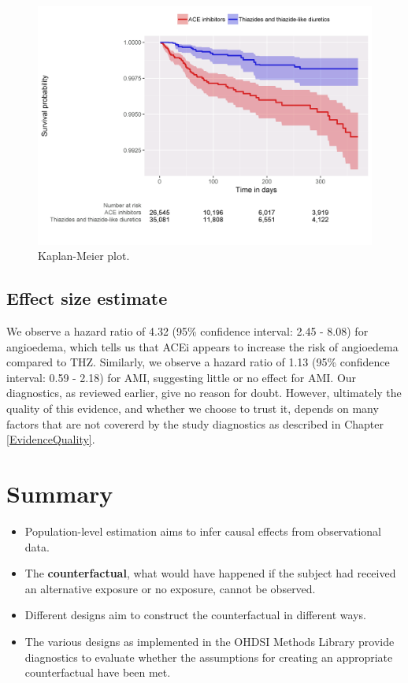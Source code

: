 \documentclass[11pt]{book}
\theoremstyle{definition}
\theoremstyle{definition}
\theoremstyle{definition}
\theoremstyle{remark}
\let\BeginKnitrBlock\begin \let\EndKnitrBlock\end
\begin{document}
\begin{figure}

{\centering \includegraphics[width=1\linewidth]{images/PopulationLevelEstimation/kmPlot} 

}

\caption{Kaplan-Meier plot.}\label{fig:kmPlot}
\end{figure}

\hypertarget{effect-size-estimate}{%
\subsection{Effect size estimate}\label{effect-size-estimate}}

We observe a hazard ratio of 4.32 (95\% confidence interval: 2.45 - 8.08) for angioedema, which tells us that ACEi appears to increase the risk of angioedema compared to THZ. Similarly, we observe a hazard ratio of 1.13 (95\% confidence interval: 0.59 - 2.18) for AMI, suggesting little or no effect for AMI. Our diagnostics, as reviewed earlier, give no reason for doubt. However, ultimately the quality of this evidence, and whether we choose to trust it, depends on many factors that are not covererd by the study diagnostics as described in Chapter \ref{EvidenceQuality}.

\hypertarget{summary-9}{%
\section{Summary}\label{summary-9}}

\BeginKnitrBlock{rmdsummary}
\begin{itemize}
\item
  Population-level estimation aims to infer causal effects from observational data.
\item
  The \textbf{counterfactual}, what would have happened if the subject had received an alternative exposure or no exposure, cannot be observed.
\item
  Different designs aim to construct the counterfactual in different ways.
\item
  The various designs as implemented in the OHDSI Methods Library provide diagnostics to evaluate whether the assumptions for creating an appropriate counterfactual have been met.
\end{itemize}
\EndKnitrBlock{rmdsummary}
\end{document}
